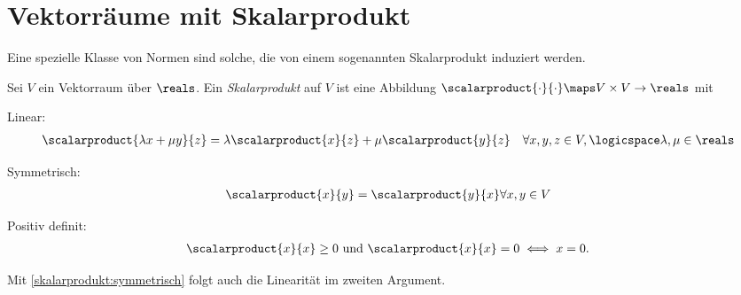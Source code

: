 \section{Vektorräume mit Skalarprodukt}
Eine spezielle Klasse von Normen sind solche, die von einem sogenannten Skalarprodukt induziert werden.
\begin{definition}
    Sei \( V \) ein Vektorraum über \( \reals \).
    Ein \emph{Skalarprodukt} auf \( V \) ist eine Abbildung \( \scalarproduct{\cdot}{\cdot}\maps V\times V\to \reals \) mit
    \begin{eigenschaftenenumerate}
        \item \label{skalarprodukt:linear}Linear: \begin{align*}
            \scalarproduct{\lambda x+\mu y}{z}=\lambda\scalarproduct{x}{z}+\mu\scalarproduct{y}{z}\quad \forall x,y,z\in V,\logicspace \lambda,\mu\in \reals
        \end{align*}
        \item \label{skalarprodukt:symmetrisch}Symmetrisch: \begin{align*}
            \scalarproduct{x}{y}=\scalarproduct{y}{x} \forall x,y\in V
        \end{align*}
        \item \label{skalarprodukt:positiv_definit}Positiv definit: \begin{align*}
            \scalarproduct{x}{x}\geq 0 \text{ und } \scalarproduct{x}{x}=0\iff x=0. 
        \end{align*}
    \end{eigenschaftenenumerate}
    
\end{definition}
\begin{bemerkung*}
    Mit \ref{skalarprodukt:symmetrisch} folgt auch die Linearität im zweiten Argument.
\end{bemerkung*}
